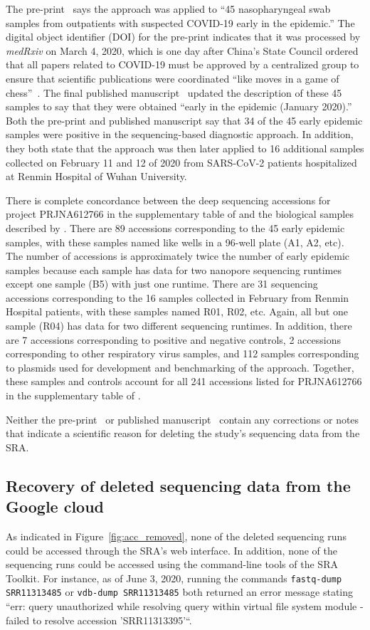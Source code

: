 \documentclass[9pt,twocolumn,twoside]{gsajnl_modified}
\begin{document}
The pre-print~\citep{Wang2020medRxiv} says the approach was applied to ``45 nasopharyngeal swab samples from outpatients with suspected COVID-19 early in the epidemic.''
The digital object identifier (DOI) for the pre-print indicates that it was processed by \textit{medRxiv} on March 4, 2020, which is one day after China's State Council ordered that all papers related to COVID-19 must be approved by a centralized group to ensure that scientific publications were coordinated ``like moves in a game of chess''~\citep{Kang2020}.
The final published manuscript~\citep{Wang2020small} updated the description of these 45 samples to say that they were obtained ``early in the epidemic (January 2020).''
Both the pre-print and published manuscript say that 34 of the 45 early epidemic samples were positive in the sequencing-based diagnostic approach.
In addition, they both state that the approach was then later applied to 16 additional samples collected on February 11 and 12 of 2020 from SARS-CoV-2 patients hospitalized at Renmin Hospital of Wuhan University.

There is complete concordance between the deep sequencing accessions for project PRJNA612766 in the supplementary table of \citet{farkas2020insights} and the biological samples described by \citet{Wang2020medRxiv}.
There are 89 accessions corresponding to the 45 early epidemic samples, with these samples named like wells in a 96-well plate (A1, A2, etc).
The number of accessions is approximately twice the number of early epidemic samples because each sample has data for two nanopore sequencing runtimes except one sample (B5) with just one runtime.
 There are 31 sequencing accessions corresponding to the 16 samples collected in February from Renmin Hospital patients, with these samples named R01, R02, etc.
 Again, all but one sample (R04) has data for two different sequencing runtimes.
 In addition, there are 7 accessions corresponding to positive and negative controls, 2 accessions corresponding to other respiratory virus samples, and 112 samples corresponding to plasmids used for development and benchmarking of the approach.
 Together, these samples and controls account for all 241 accessions listed for PRJNA612766 in the supplementary table of \citet{farkas2020insights}.

Neither the pre-print~\citep{Wang2020medRxiv} or published manuscript~\citep{Wang2020small} contain any corrections or notes that indicate a scientific reason for deleting the study's sequencing data from the SRA.

\subsection{Recovery of deleted sequencing data from the Google cloud} 
As indicated in Figure~\ref{fig:acc_removed}, none of the deleted sequencing runs could be accessed through the SRA's web interface.
In addition, none of the sequencing runs could be accessed using the command-line tools of the SRA Toolkit.
For instance, as of June 3, 2020, running the commands \texttt{fastq-dump SRR11313485} or \texttt{vdb-dump SRR11313485} both returned an error message stating ``err: query unauthorized while resolving query within virtual file system module - failed to resolve accession 'SRR11313395'``.
\end{document}
